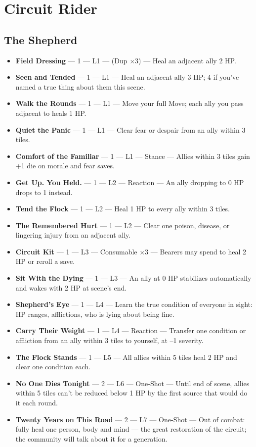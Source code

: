 \section{Circuit Rider}

\subsection{The Shepherd}
\begin{itemize}
    \item \textbf{Field Dressing} --- 1 --- L1 --- (Dup ×3) --- Heal an adjacent ally 2 HP.
    \item \textbf{Seen and Tended} --- 1 --- L1 --- Heal an adjacent ally 3 HP; 4 if you've named a true thing about them this scene.
    \item \textbf{Walk the Rounds} --- 1 --- L1 --- Move your full Move; each ally you pass adjacent to heals 1 HP.
    \item \textbf{Quiet the Panic} --- 1 --- L1 --- Clear fear or despair from an ally within 3 tiles.
    \item \textbf{Comfort of the Familiar} --- 1 --- L1 --- Stance --- Allies within 3 tiles gain +1 die on morale and fear saves.
    \item \textbf{Get Up. You Held.} --- 1 --- L2 --- Reaction --- An ally dropping to 0 HP drops to 1 instead.
    \item \textbf{Tend the Flock} --- 1 --- L2 --- Heal 1 HP to every ally within 3 tiles.
    \item \textbf{The Remembered Hurt} --- 1 --- L2 --- Clear one poison, disease, or lingering injury from an adjacent ally.
    \item \textbf{Circuit Kit} --- 1 --- L3 --- Consumable ×3 --- Bearers may spend to heal 2 HP or reroll a save.
    \item \textbf{Sit With the Dying} --- 1 --- L3 --- An ally at 0 HP stabilizes automatically and wakes with 2 HP at scene's end.
    \item \textbf{Shepherd's Eye} --- 1 --- L4 --- Learn the true condition of everyone in sight: HP ranges, afflictions, who is lying about being fine.
    \item \textbf{Carry Their Weight} --- 1 --- L4 --- Reaction --- Transfer one condition or affliction from an ally within 3 tiles to yourself, at --1 severity.
    \item \textbf{The Flock Stands} --- 1 --- L5 --- All allies within 5 tiles heal 2 HP and clear one condition each.
    \item \textbf{No One Dies Tonight} --- 2 --- L6 --- One-Shot --- Until end of scene, allies within 5 tiles can't be reduced below 1 HP by the first source that would do it each round.
    \item \textbf{Twenty Years on This Road} --- 2 --- L7 --- One-Shot --- Out of combat: fully heal one person, body and mind --- the great restoration of the circuit; the community will talk about it for a generation.
\end{itemize}

